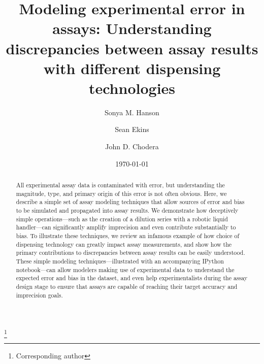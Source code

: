 \documentclass[aps,pre,twocolumn,nofootinbib,superscriptaddress,linenumbers]{revtex4-1}
\begin{document}
\title{Modeling experimental error in assays: Understanding discrepancies between assay results with different dispensing technologies}

\author{Sonya M. Hanson}
\author{Sean Ekins}
\author{John D. Chodera}
 \thanks{Corresponding author}

\date{\today}

\begin{abstract}

All experimental assay data is contaminated with error, but understanding the magnitude, type, and primary origin of this error is not often obvious.
Here, we describe a simple set of assay modeling techniques that allow sources of error and bias to be simulated and propagated into assay results.
We demonstrate how deceptively simple operations---such as the creation of a dilution series with a robotic liquid handler---can significantly amplify imprecision and even contribute substantially to bias.
To illustrate these techniques, we review an infamous example of how choice of dispensing technology can greatly impact assay measurements, and show how the primary contributions to discrepancies between assay results can be easily understood.
These simple modeling techniques---illustrated with an accompanying IPython notebook---can allow modelers making use of experimental data to understand the expected error and bias in the dataset, and even help experimentalists during the assay design stage to ensure that assays are capable of reaching their target accuracy and imprecision goals.

\end{abstract}

\maketitle
\end{document}
